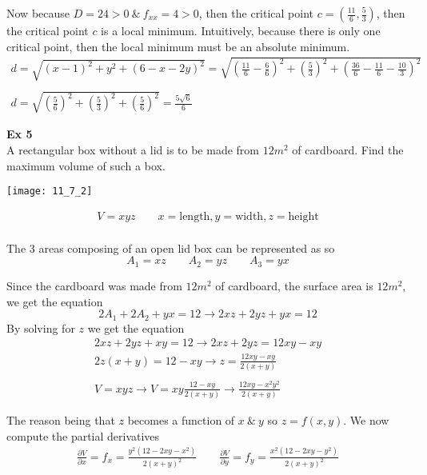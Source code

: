 \documentclass{article}
\begin{document}
    Now because $ D =24>0 ~\&~ f_{xx}=4>0$, then the critical point $ c= (\frac{11}{6},\frac{5}{3}) $, then the critical point $ c $ is a local minimum. Intuitively, because there is only one critical point, then the local minimum must be an absolute minimum.
  \[
    \begin{gathered}
        d=\sqrt{(x-1)^{2}+y^{2}+(6-x-2y)^{2}} = \sqrt{(\frac{11}{6}-\frac{6}{6})^{2}+(\frac{5}{3})^{2}+(\frac{36}{6}-\frac{11}{6}-\frac{10}{3})^{2}}\\
        ~\\
      d=\sqrt{(\frac{5}{6})^{2}+(\frac{5}{3})^{2}+(\frac{5}{6})^{2}}=\boxed{\frac{5\sqrt{6}}{6}} 
    \end{gathered}
  \]

  \textbf{Ex 5}\\
  A rectangular box without a lid is to be made from $ 12m^{2} $ of cardboard. Find the maximum volume of such a box.
  \begin{center}
    \texttt{[image: 11\_7\_2]}
  \end{center}
  \[
    \begin{gathered}
    V=xyz \qquad x=\text{length},y=\text{width},z=\text{height}\\
    \end{gathered}
  \]
  
  The 3 areas composing of an open lid box can be represented as so
  \[
    A_1=xz \qquad A_2 = yz \qquad A_3 = yx
  \]

  Since the cardboard was made from $ 12m^{2} $ of cardboard, the surface area is $ 12m^{2} $, we get the equation
  \[
    2A_1 + 2A_2+yx=12 \to 2xz +2yz+yx=12
  \]
  By solving for $ z $ we get the equation
  \[
    \begin{gathered}
      2xz+2yz+xy=12 \to 2xz+2yz=12xy-xy\\
      2z(x+y)=12-xy \to z=\frac{12xy-xy}{2(x+y)}\\
      ~\\
      V=xyz \to V=xy\frac{12-xy}{2(x+y)} \to \frac{12xy-x^{2}y^{2}}{2(x+y)}
    \end{gathered}
  \]

  The reason being that $ z $ becomes a function of $ x ~\&~ y $ so $ z=f(x,y)$. We now compute the partial derivatives
  \[
    \begin{gathered}
    \frac{\partial V}{\partial x}=f_x=\frac{y^{2}(12-2xy-x^{2})}{2(x+y)^{2}} \qquad
    \frac{\partial V}{\partial y}=f_y=\frac{x^{2}(12-2xy-y^{2})}{2(x+y)^{2}}
    \end{gathered}
  \]
\end{document}
